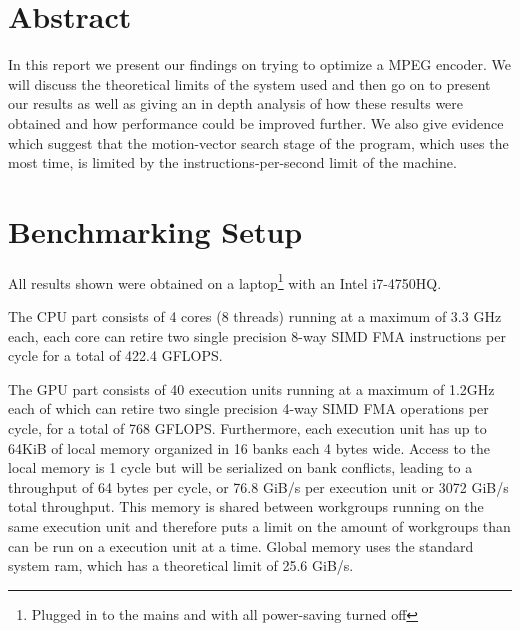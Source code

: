 
\usepackage[T1]{fontenc}          %

\tableofcontents

\section{Abstract}
In this report we present our findings on trying to optimize a MPEG encoder. We will discuss the theoretical limits of the
system used and then go on to present our results as well as giving an in depth analysis of how these results were obtained and
how performance could be improved further. We also give evidence which suggest that the motion-vector search stage of the program,
which uses the most time, is limited by the instructions-per-second limit of the machine.

\section{Benchmarking Setup}
\par All results shown were obtained on a laptop\footnote{Plugged in to the mains and with all power-saving turned off} with an
Intel i7-4750HQ.
\par The CPU part consists of 4 cores (8 threads) running at a maximum of 3.3 GHz each, each core can retire two single precision 8-way SIMD
FMA instructions per cycle for a total of 422.4 GFLOPS.

\par The GPU part consists of 40 execution units running at a maximum of 1.2GHz each of which can retire two single precision 4-way SIMD FMA
operations per cycle, for a total of 768 GFLOPS.  Furthermore, each execution unit has up to 64KiB of local memory organized in 16 banks each 4 bytes wide.
Access to the local memory is 1 cycle but will be serialized on bank conflicts, leading to a throughput of 64 bytes per cycle, or 76.8 GiB/s per execution unit or
3072 GiB/s total throughput. This memory is shared between workgroups running on the same execution unit and therefore puts a limit on the amount of workgroups than can be run
on a execution unit at a time. Global memory uses the standard system ram, which has a theoretical limit of 25.6 GiB/s.

